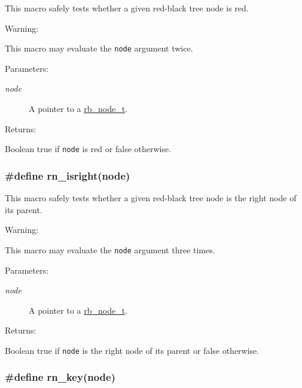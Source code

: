 This macro safely tests whether a given red-black tree node is red.

\begin{Desc}
\item[Warning: ]\par
This macro may evaluate the {\tt node} argument twice.\end{Desc}
\begin{Desc}
\item[Parameters: ]\par
\begin{description}
\item[{\em 
node}]A pointer to a \hyperlink{group__dbprim__rbtree_a1}{rb\_\-node\_\-t}.\end{description}
\end{Desc}
\begin{Desc}
\item[Returns: ]\par
Boolean true if {\tt node} is red or false otherwise. \end{Desc}
\hypertarget{group__dbprim__rbtree_a37}{
\subsubsection[rn\_\-isright]{\setlength{\rightskip}{0pt plus 5cm}\#define rn\_\-isright(node)}}
\label{group__dbprim__rbtree_a37}


This macro safely tests whether a given red-black tree node is the right node of its parent.

\begin{Desc}
\item[Warning: ]\par
This macro may evaluate the {\tt node} argument three times.\end{Desc}
\begin{Desc}
\item[Parameters: ]\par
\begin{description}
\item[{\em 
node}]A pointer to a \hyperlink{group__dbprim__rbtree_a1}{rb\_\-node\_\-t}.\end{description}
\end{Desc}
\begin{Desc}
\item[Returns: ]\par
Boolean true if {\tt node} is the right node of its parent or false otherwise. \end{Desc}
\hypertarget{group__dbprim__rbtree_a32}{
\subsubsection[rn\_\-key]{\setlength{\rightskip}{0pt plus 5cm}\#define rn\_\-key(node)}}
\label{group__dbprim__rbtree_a32}


